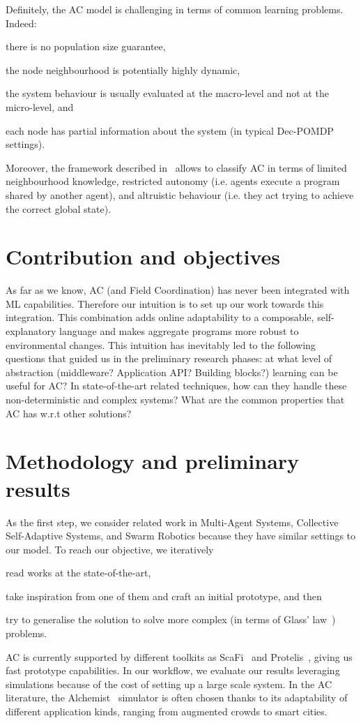 \documentclass[conference]{IEEEtran}
\begin{document}
Definitely, the AC model is challenging in terms of common learning problems. Indeed:
\begin{enumerate*}[label=(\roman*)]
\item there is no population size guarantee,
\item the node neighbourhood is potentially highly dynamic,
\item the system behaviour is usually evaluated at the macro-level and not at the micro-level, and
\item each node has partial information about the system (in typical Dec-POMDP~\cite{DBLP:conf/uai/BernsteinZI00} settings).
\end{enumerate*}
Moreover, the framework described in~\cite{DAngelo2019} allows to classify AC in terms of limited neighbourhood knowledge, restricted autonomy (i.e. agents execute a program shared by another agent), and altruistic behaviour (i.e. they act trying to achieve the correct global state).
\section{Contribution and objectives}
As far as we know, AC (and Field Coordination) has never been integrated with ML capabilities.
%
Therefore our intuition is to set up our work towards this integration.
%
This combination adds online adaptability to a composable, self-explanatory language and makes aggregate programs more robust to environmental changes.
%
This intuition has inevitably led to the following questions that guided us in the preliminary research phases: 
at what level of abstraction (middleware? Application API? Building blocks?) learning can be useful for AC?
%
In state-of-the-art related techniques, how can they handle these non-deterministic and complex systems?
%
What are the common properties that AC has w.r.t other solutions?
\section{Methodology and preliminary results}
%
As the first step, we consider related work in Multi-Agent Systems, Collective Self-Adaptive Systems, and Swarm Robotics because they have similar settings to our model.
To reach our objective, we iteratively 
\begin{enumerate*}[label=(\roman*)]
\item read works at the state-of-the-art,
\item take inspiration from one of them and craft an initial prototype, and then
\item try to generalise the solution to solve more complex (in terms of Glass' law~\cite{DBLP:journals/software/Glass01}) problems.
\end{enumerate*}
AC is currently supported by different toolkits as ScaFi~\cite{DBLP:conf/ecoop/CasadeiV16} and Protelis~\cite{DBLP:conf/sac/PianiniVB15}, giving us fast prototype capabilities.
%
In our workflow, we evaluate our results leveraging simulations because of the cost of setting up a large scale system.
%
In the AC literature, the Alchemist~\cite{alchemist-jos2013} simulator is often chosen thanks to its adaptability of different application kinds, ranging from augmented crowds to smart cities.
\end{document}
